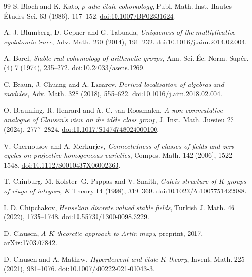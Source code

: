 \begin{thebibliography}{99}
 S. Bloch and K. Kato,
\emph{$p$-adic \'etale cohomology},
Publ. Math. Inst. Hautes \'Etudes Sci. 63 (1986), 107--152.
\href{https://doi.org/10.1007/BF02831624}{doi:10.1007/BF02831624}.

 A. J. Blumberg, D. Gepner and G. Tabuada,
\emph{Uniqueness of the multiplicative cyclotomic trace},
Adv. Math. 260 (2014), 191--232.
\href{https://doi.org/10.1016/j.aim.2014.02.004}{doi:10.1016/j.aim.2014.02.004}.

 A. Borel,
\emph{Stable real cohomology of arithmetic groups},
Ann. Sci. Éc. Norm. Supér. (4) 7 (1974), 235--272.
\href{https://doi.org/10.24033/asens.1269}{doi:10.24033/asens.1269}.

 C. Braun, J. Chuang and A. Lazarev,
\emph{Derived localisation of algebras and modules},
Adv. Math. 328 (2018), 555--622.
\href{https://doi.org/10.1016/j.aim.2018.02.004}{doi:10.1016/j.aim.2018.02.004}.

 O. Braunling, R. Henrard and A.-C. van Roosmalen,
\emph{A non-commutative analogue of Clausen's view on the id\`ele class group},
J. Inst. Math. Jussieu 23 (2024), 2777--2824.
\href{https://doi.org/10.1017/S1474748024000100}{doi:10.1017/S1474748024000100}.

 V. Chernousov and A. Merkurjev,
\emph{Connectedness of classes of fields and zero-cycles on projective homogeneous varieties},
Compos. Math. 142 (2006), 1522--1548.
\href{https://doi.org/10.1112/S0010437X06002363}{doi:10.1112/S0010437X06002363}.

 T. Chinburg, M. Kolster, G. Pappas and V. Snaith,
\emph{Galois structure of \(K\)-groups of rings of integers},
\(K\)-Theory 14 (1998), 319--369.
\href{https://doi.org/10.1023/A:1007751422988}{doi:10.1023/A:1007751422988}.

 I. D. Chipchakov,
\emph{Henselian discrete valued stable fields},
Turkish J. Math. 46 (2022), 1735--1748.
\href{https://doi.org/10.55730/1300-0098.3229}{doi:10.55730/1300-0098.3229}.

 D. Clausen,
\emph{A $K$-theoretic approach to Artin maps}, preprint, 2017,
\href{https://arxiv.org/abs/1703.07842v2}{arXiv:1703.07842}.

 D. Clausen and A. Mathew,
\emph{Hyperdescent and étale $K$-theory},
Invent. Math. 225 (2021), 981--1076.
\href{https://doi.org/10.1007/s00222-021-01043-3}{doi:10.1007/s00222-021-01043-3}.


\end{thebibliography}
